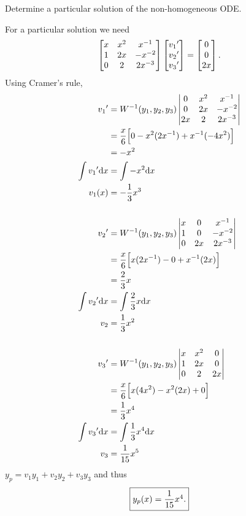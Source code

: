 Determine a particular solution of the non-homogeneous ODE.

\soln* For a particular solution we need 
$$\bmaty{x}{x^2}{x^{-1}}{1}{2x}{-x^{-2}}{0}{2}{2x^{-3}} \vvec*{{v_1}'}{{v_2}'}{{v_3}'} = \vvec*{0}{0}{2x}.$$
Using Cramer's rule, 
\begin{align*}
    {v_1}' &= W^{-1}(y_1, y_2, y_3) \begin{vmatrix}{0} & {x^2} & {x^{-1}} \\{0}&{2x}&{-x^{-2}}\\ {2x} & {2} & {2x^{-3}}\end{vmatrix} \\
    &= \frac{x}{6} \Big[ { 0 - x^2(2x^{-1}) + x^{-1}(-4x^2) } \Big] \\
    &= -x^2\\
    \int {v_1}' \dd x &= \int -x^2 \dd x\\
    v_1(x) &= -\frac{1}{3}x^3\\
    &
    \\
    {v_2}' &= W^{-1}(y_1, y_2, y_3) \begin{vmatrix}{x} & {0} & {x^{-1}} \\{1}&{0}&{-x^{-2}}\\ {0} & {2x} & {2x^{-3}}\end{vmatrix} \\
    &= \frac{x}{6} \Big[ { x (2x^{-1}) - 0 + x^{-1}(2x) } \Big]\\
    &= \frac{2}{3}x\\
    \int {v_2}' \dd x &= \int \frac{2}{3}x \dd x\\
    v_2 &= \frac{1}{3}x^2\\
    &
    \\
    {v_3}' &= W^{-1}(y_1, y_2, y_3) \begin{vmatrix}{x} & {x^2} & {0} \\{1}&{2x}&{0}\\ {0} & {2} & {2x}\end{vmatrix} \\
    &= \frac{x}{6} \Big[ {x(4x^2) -x^2 (2x) + 0} \Big]\\
    &= \frac 13 x^4 \\
    \int {v_3}' \dd x &= \int \frac 13 x^4 \dd x\\
    v_3 &= \frac{1}{15} x^5
\end{align*}
$y_p = v_1 y_1 + v_2 y_2 + v_3 y_3$ and thus $$\boxed{$$y_p(x)  = \dfrac{1}{15}x^4.$$}$$